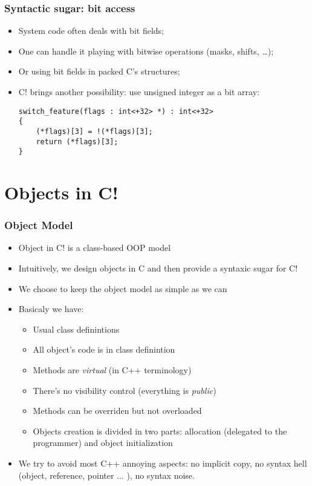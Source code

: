 \documentclass[pdftex]{beamer}
\begin{document}
\begin{frame}[fragile]
  \frametitle{Syntactic sugar: bit access}

  \begin{itemize}
  \item System code often deals with bit fields;
  \item One can handle it playing with bitwise operations (masks, shifts,
    \ldots); \item Or using bit fields in packed C's structures;
  \item C! brings another possibility: use unsigned integer as a bit array:
\begin{verbatim}
switch_feature(flags : int<+32> *) : int<+32>
{
    (*flags)[3] = !(*flags)[3];
    return (*flags)[3];
}
\end{verbatim}
  \end{itemize}
\end{frame}



\section{Objects in C!}



\begin{frame}
  \frametitle{Object Model}
  \begin{itemize}
  \item Object in C! is a class-based OOP model
  \item Intuitively, we design objects in C and then provide a
    syntaxic sugar for C!
  \item We choose to keep the object model as simple as we can
  \item Basicaly we have:
    \begin{itemize}
    \item Usual class definintions
    \item All object's code is in class definintion
    \item Methods are \emph{virtual} (in C++ terminology)
    \item There's no visibility control (everything is \emph{public})
    \item Methods can be overriden but not overloaded
    \item Objects creation is divided in two parts: allocation
      (delegated to the programmer) and object initialization
    \end{itemize}
  \item We try to avoid most C++ annoying aspects: no implicit copy,
    no syntax hell (object, reference, pointer ... ), no syntax noise.
  \end{itemize}
\end{frame}
\end{document}
